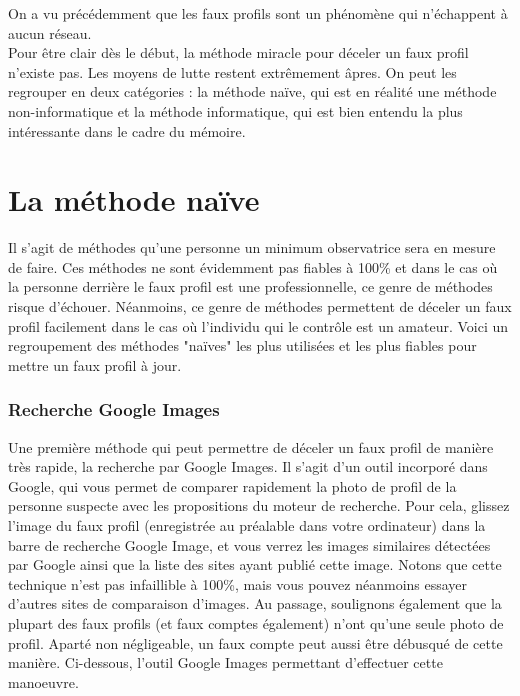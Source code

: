 \documentclass[12pt]{report}
\begin{document}
On a vu précédemment que les faux profils sont un phénomène qui n'échappent à aucun réseau.\\
Pour être clair dès le début, la méthode miracle pour déceler un faux profil n'existe pas. Les moyens de lutte restent extrêmement âpres. On peut les regrouper en deux catégories : la méthode naïve, qui est en réalité une méthode non-informatique et la méthode informatique, qui est bien entendu la plus intéressante dans le cadre du mémoire.\\

\section{La méthode naïve}
Il s'agit de méthodes qu'une personne un minimum observatrice sera en mesure de faire. Ces méthodes ne sont évidemment pas fiables à 100\% et dans le cas où la personne derrière le faux profil est une professionnelle, ce genre de méthodes risque d'échouer. Néanmoins, ce genre de méthodes permettent de déceler un faux profil facilement dans le cas où l'individu qui le contrôle est un amateur. Voici un regroupement des méthodes "naïves" les plus utilisées et les plus fiables pour mettre un faux profil à jour.  

\subsubsection{Recherche Google Images}
Une première méthode qui peut permettre de déceler un faux profil de manière très rapide, la recherche par Google Images. Il s’agit d’un outil incorporé dans Google, qui vous permet de comparer rapidement la photo de profil de la personne suspecte avec les propositions du moteur de recherche. Pour cela, glissez l’image du faux profil (enregistrée au préalable dans votre ordinateur) dans la barre de recherche Google Image, et vous verrez les images similaires détectées par Google ainsi que la liste des sites ayant publié cette image. Notons que cette technique n’est pas infaillible à 100\%, mais vous pouvez néanmoins essayer d’autres sites de comparaison d’images. Au passage, soulignons également que la plupart des faux profils (et faux comptes également) n’ont qu’une seule photo de profil. Aparté non négligeable, un faux compte peut aussi être débusqué de cette manière.
Ci-dessous, l'outil Google Images permettant d'effectuer cette manoeuvre.
\end{document}
